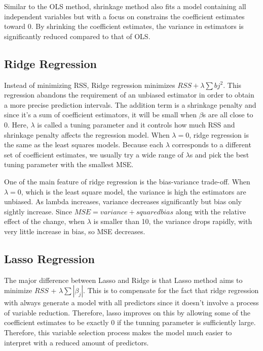 \documentclass{article}
\begin{document}
Similar to the OLS method, shrinkage method also fits a model containing all independent variables but with a focus on constrains the coefficient estimates toward 0. By shrinking the coefficient estimates, the variance in estimators is significantly reduced compared to that of OLS. 

\subsection{Ridge Regression }

Instead of minimizing RSS, Ridge regression minimizes $RSS + \lambda \sum bj^2$. This regression abandons the requirement of an unbiased estimator in order to obtain a more precise prediction intervals. The addition term is a shrinkage penalty and since it's a sum of coefficient estimators, it will be small when $\beta$s are all close to 0. Here, $\lambda$ is called a tuning parameter and it controls how much RSS and shrinkage penalty affects the regression model. When $\lambda = 0$, ridge regression is the same as the least squares models. Because each $\lambda$ corresponds to a different set of coefficient estimates, we usually try a wide range of $\lambda$s and pick the best tuning parameter with the smallest MSE. 

One of the main feature of ridge regression is the bias-variance trade-off. When $\lambda = 0$, which is the least square model, the variance is high the estimators are unbiased. As lambda increases, variance decreases significantly but bias only sightly increase. Since $MSE = variance + squared bias$ along with the relative effect of the change, when $\lambda$ is smaller than 10, the variance drops rapidly, with very little increase in bias, so MSE decreases. 

\subsection{Lasso Regression}

The major difference between Lasso and Ridge is that Lasso method aims to minimize $RSS$ + $\lambda \sum |{\beta_j}|$. This is to compensate for the fact that ridge regression with always generate a model with all predictors since it doesn't involve a process of variable reduction. Therefore, lasso improves on this by allowing some of the coefficient estimates to be exactly 0 if the tunning parameter is sufficiently large. Therefore, this variable selection process makes the model much easier to interpret with a reduced amount of predictors. 
\end{document}
